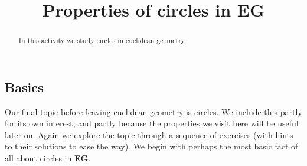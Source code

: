 \documentclass{ximera}
\title{Properties of circles in \textbf{EG}}
\begin{document}
\begin{abstract}
In this activity we study circles in euclidean geometry.
\end{abstract}
\maketitle


\subsection*{Basics}

Our final topic before leaving euclidean geometry is circles. We
include this partly for its own interest, and partly because the
properties we visit here will be useful later on. Again we explore the
topic through a sequence of exercises (with hints to their solutions
to ease the way). We begin with perhaps the most basic fact of all
about circles in \textbf{EG}.
\end{document}
